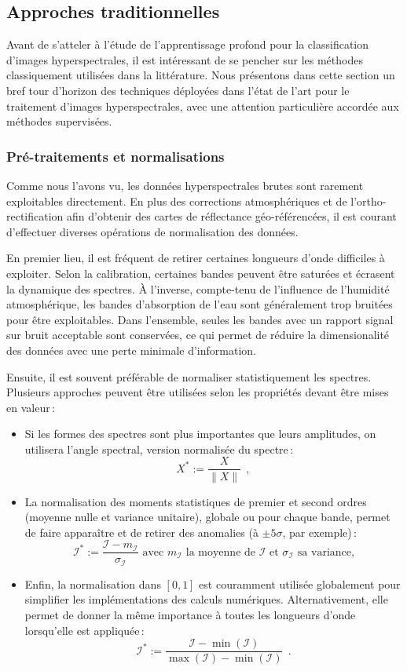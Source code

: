 \subsection{Approches traditionnelles}

Avant de s'atteler à l'étude de l'apprentissage profond pour la classification d'images hyperspectrales, il est intéressant de se pencher sur les méthodes classiquement utilisées dans la littérature. Nous présentons dans cette section un bref tour d'horizon des techniques déployées dans l'état de l'art pour le traitement d'images hyperspectrales, avec une attention particulière accordée aux méthodes supervisées.

\subsubsection{Pré-traitements et normalisations}

Comme nous l'avons vu, les données hyperspectrales brutes sont rarement exploitables directement. En plus des corrections atmosphériques et de l'ortho-rectification afin d'obtenir des cartes de réflectance géo-référencées, il est courant d'effectuer diverses opérations de normalisation des données.

En premier lieu, il est fréquent de retirer certaines longueurs d'onde difficiles à exploiter. Selon la calibration, certaines bandes peuvent être saturées et écrasent la dynamique des spectres. À l'inverse, compte-tenu de l'influence de l'humidité atmosphérique, les bandes d'absorption de l'eau sont généralement trop bruitées pour être exploitables. Dans l'ensemble, seules les bandes avec un rapport signal sur bruit acceptable sont conservées, ce qui permet de réduire la dimensionalité des données avec une perte minimale d'information.

Ensuite, il est souvent préférable de normaliser statistiquement les spectres. Plusieurs approches peuvent être utilisées selon les propriétés devant être mises en valeur\,:
\begin{itemize}
\item Si les formes des spectres sont plus importantes que leurs amplitudes, on utilisera l'angle spectral, version normalisée du spectre\,:
$$X^* := \frac{X}{\| X \|}~~,$$
\item La normalisation des moments statistiques de premier et second ordres (moyenne nulle et variance unitaire), globale ou pour chaque bande, permet de faire apparaître et de retirer des anomalies (à $\pm5\sigma$, par exemple)\,:
$$\mathcal{I}^* := \frac{\mathcal{I} - m_\mathcal{I}}{\sigma_\mathcal{I}} \text{ avec } m_\mathcal{I} \text{ la moyenne de } \mathcal{I} \text{ et } \sigma_\mathcal{I} \text{ sa variance,}$$
\item Enfin, la normalisation dans $[0,1]$ est couramment utilisée globalement pour simplifier les implémentations des calculs numériques. Alternativement, elle permet de donner la même importance à toutes les longueurs d'onde lorsqu'elle est appliquée\,:
$$\mathcal{I}^* := \frac{\mathcal{I} - \min(\mathcal{I})}{\max(\mathcal{I}) - \min(\mathcal{I})}~~.$$
\end{itemize}


